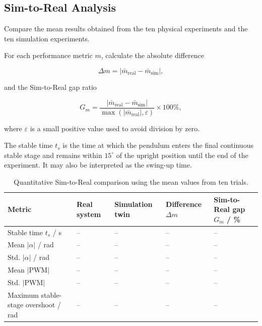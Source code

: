 \documentclass[11pt,a4paper]{article}
\begin{document}
\subsection{Sim-to-Real Analysis}

Compare the mean results obtained from the ten physical experiments and the ten
simulation experiments.

For each performance metric \(m\), calculate the absolute difference

\begin{equation}
\Delta m
=
\left|
\bar{m}_{\mathrm{real}}
-
\bar{m}_{\mathrm{sim}}
\right|,
\end{equation}

and the Sim-to-Real gap ratio

\begin{equation}
G_m
=
\frac{
\left|
\bar{m}_{\mathrm{real}}
-
\bar{m}_{\mathrm{sim}}
\right|}
{\max\left(
\left|\bar{m}_{\mathrm{real}}\right|,
\varepsilon
\right)}
\times 100\%,
\end{equation}

where \(\varepsilon\) is a small positive value used to avoid division by zero.

The stable time \(t_s\) is the time at which the pendulum enters the final
continuous stable stage and remains within \(15^\circ\) of the upright position
until the end of the experiment. It may also be interpreted as the swing-up
time.

\begin{table}[H]
\centering
\caption{Quantitative Sim-to-Real comparison using the mean values from ten trials.}
\label{tab:sim2real}
\small
\begin{tabularx}{\linewidth}
{l
 >{\centering\arraybackslash}X
 >{\centering\arraybackslash}X
 >{\centering\arraybackslash}X
 >{\centering\arraybackslash}X}
\toprule
Metric
& Real system
& Simulation twin
& Difference \(\Delta m\)
& Sim-to-Real gap \(G_m\) / \%\\
\midrule
Stable time \(t_s\) / s
& -- & -- & -- & --\\

Mean \( |\alpha| \) / rad
& -- & -- & -- & --\\

Std. \( |\alpha| \) / rad
& -- & -- & -- & --\\

Mean \( |\mathrm{PWM}| \)
& -- & -- & -- & --\\

Std. \( |\mathrm{PWM}| \)
& -- & -- & -- & --\\

Maximum stable-stage overshoot / rad
& -- & -- & -- & --\\
\bottomrule
\end{tabularx}
\end{table}
\end{document}
